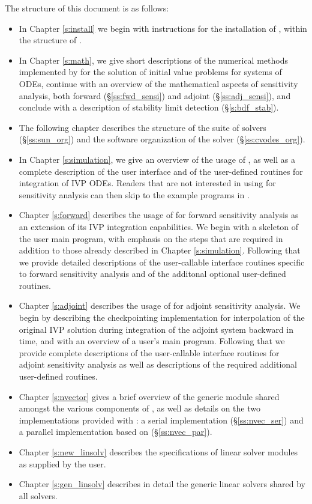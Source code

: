 The structure of this document is as follows:
\begin{itemize}
\item
  In Chapter \ref{s:install} we begin with instructions for the installation of 
  {\cvodes}, within the structure of {\sundials}.
\item
  In Chapter \ref{s:math}, we give short descriptions of the numerical 
  methods implemented by {\cvodes} for the solution of initial value problems
  for systems of ODEs, continue with an overview of the mathematical aspects 
  of sensitivity analysis, both forward (\S\ref{ss:fwd_sensi}) and adjoint
  (\S\ref{ss:adj_sensi}), and conclude with a description of stability limit
  detection (\S\ref{s:bdf_stab}).
\item
  The following chapter describes the structure of the {\sundials} suite
  of solvers (\S\ref{ss:sun_org}) and the software organization of the {\cvodes}
  solver (\S\ref{ss:cvodes_org}). 
\item
  In Chapter \ref{s:simulation}, we give an overview of the usage of {\cvodes},
  as well as a complete description of the user interface and of the 
  user-defined routines for integration of IVP ODEs. Readers that are not 
  interested in using {\cvodes} for sensitivity analysis can then 
  skip to the example programs in \cite{cvode2.2.0_ex}.
\item
  Chapter \ref{s:forward} describes the usage of {\cvodes} for forward
  sensitivity analysis as an extension of its IVP integration capabilities. 
  We begin with a skeleton of the user main program, with emphasis on the 
  steps that are required in addition to those already described in Chapter \ref{s:simulation}.
  Following that we provide detailed descriptions of the user-callable interface routines 
  specific to forward sensitivity analysis and of the additonal optional user-defined
  routines.
\item
  Chapter \ref{s:adjoint} describes the usage of {\cvodes} for adjoint
  sensitivity analysis. We begin by describing the {\cvodes} checkpointing 
  implementation for interpolation of the original IVP solution during
  integration of the adjoint system backward in time, and with 
  an overview of a user's main program. Following that we provide complete
  descriptions of the user-callable interface routines for adjoint sensitivity
  analysis as well as descriptions of the required additional user-defined routines.
\item
  Chapter \ref{s:nvector} gives a brief overview of the generic {\nvector} module 
  shared amongst the various components of {\sundials}, as well as details on the two {\nvector}
  implementations provided with {\sundials}: a serial implementation
  (\S\ref{ss:nvec_ser}) and a parallel implementation based on {\mpi}
  (\S\ref{ss:nvec_par}).
\item
  Chapter \ref{s:new_linsolv} describes the specifications of linear solver modules as 
  supplied by the user.
\item
  Chapter \ref{s:gen_linsolv} describes in detail the generic linear solvers shared 
  by all {\sundials} solvers.
\end{itemize}

